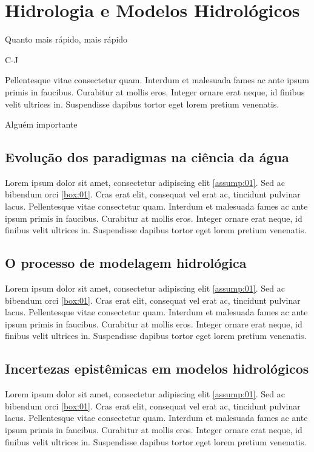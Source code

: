 \documentclass[./main.tex]{subfiles}
\begin{document}
\chapter{Hidrologia e Modelos Hidrológicos} \label{chap:hydro}

\epigraph{Quanto mais rápido, mais rápido}{C-J}

\epigraph{Pellentesque vitae consectetur quam. Interdum et malesuada fames ac ante ipsum primis in faucibus. Curabitur at mollis eros. Integer ornare erat neque, id finibus velit ultrices in. Suspendisse dapibus tortor eget lorem pretium venenatis.}{Alguém importante}

\section{Evolução dos paradigmas na ciência da água}

\par Lorem ipsum dolor sit amet, consectetur adipiscing elit \ref{assump:01}. Sed ac bibendum orci \ref{box:01}. Cras erat elit, consequat vel erat ac, tincidunt pulvinar lacus. Pellentesque vitae consectetur quam. Interdum et malesuada fames ac ante ipsum primis in faucibus. Curabitur at mollis eros. Integer ornare erat neque, id finibus velit ultrices in. Suspendisse dapibus tortor eget lorem pretium venenatis.

\section{O processo de modelagem hidrológica}

\par Lorem ipsum dolor sit amet, consectetur adipiscing elit \ref{assump:01}. Sed ac bibendum orci \ref{box:01}. Cras erat elit, consequat vel erat ac, tincidunt pulvinar lacus. Pellentesque vitae consectetur quam. Interdum et malesuada fames ac ante ipsum primis in faucibus. Curabitur at mollis eros. Integer ornare erat neque, id finibus velit ultrices in. Suspendisse dapibus tortor eget lorem pretium venenatis.

\section{Incertezas epistêmicas em modelos hidrológicos}

\par Lorem ipsum dolor sit amet, consectetur adipiscing elit \ref{assump:01}. Sed ac bibendum orci \ref{box:01}. Cras erat elit, consequat vel erat ac, tincidunt pulvinar lacus. Pellentesque vitae consectetur quam. Interdum et malesuada fames ac ante ipsum primis in faucibus. Curabitur at mollis eros. Integer ornare erat neque, id finibus velit ultrices in. Suspendisse dapibus tortor eget lorem pretium venenatis.
\end{document}
